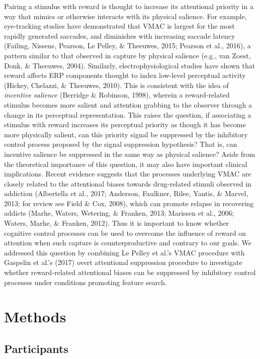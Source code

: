 \documentclass[man, a4paper, noextraspace, 11pt,floatsintext]{apa6}
\theoremstyle{definition}
\theoremstyle{definition}
\theoremstyle{definition}
\theoremstyle{remark}
\begin{document}
Pairing a stimulus with reward is thought to increase its attentional
priority in a way that mimics or otherwise interacts with its physical
salience. For example, eye-tracking studies have demonstrated that VMAC
is largest for the most rapidly generated saccades, and diminishes with
increasing saccade latency (Failing, Nissens, Pearson, Le Pelley, \&
Theeuwes, 2015; Pearson et al., 2016), a pattern similar to that
observed in capture by physical salience (e.g., van Zoest, Donk, \&
Theeuwes, 2004). Similarly, electrophysiological studies have shown that
reward affects ERP components thought to index low-level perceptual
activity (Hickey, Chelazzi, \& Theeuwes, 2010). This is consistent with
the idea of \emph{incentive salience} (Berridge \& Robinson, 1998),
wherein a reward-related stimulus becomes more salient and attention
grabbing to the observer through a change in its perceptual
representation. This raises the question, if associating a stimulus with
reward increases its perceptual priority as though it has become more
physically salient, can this priority signal be suppressed by the
inhibitory control process proposed by the signal suppression
hypothesis? That is, can incentive salience be suppressed in the same
way as physical salience? Aside from the theoretical importance of this
question, it may also have important clinical implications. Recent
evidence suggests that the processes underlying VMAC are closely related
to the attentional biases towards drug-related stimuli observed in
addiction (Albertella et al., 2017; Anderson, Faulkner, Rilee, Yantis,
\& Marvel, 2013; for review see Field \& Cox, 2008), which can promote
relapse in recovering addicts (Marhe, Waters, Wetering, \& Franken,
2013; Marissen et al., 2006; Waters, Marhe, \& Franken, 2012). Thus it
is important to know whether cognitive control processes can be used to
overcome the influence of reward on attention when such capture is
counterproductive and contrary to our goals. We addressed this question
by combining Le Pelley et al.'s VMAC procedure with Gaspelin et al.'s
(2017) overt attentional suppression procedure to investigate whether
reward-related attentional biases can be suppressed by inhibitory
control processes under conditions promoting feature search.

\section{Methods}\label{methods}

\subsection{Participants}\label{participants}
\end{document}

